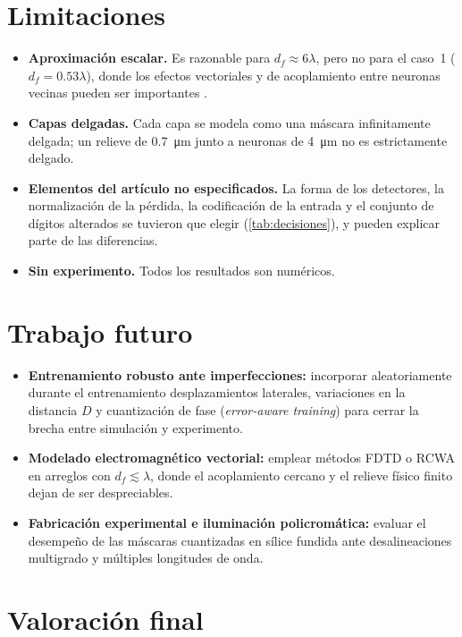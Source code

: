 \section{Limitaciones}

\begin{itemize}
  \item \textbf{Aproximación escalar.} Es razonable para $d_f\approx6\lambda$, pero no para el
  caso~1 ($d_f=0.53\lambda$), donde los efectos vectoriales y de acoplamiento entre neuronas
  vecinas pueden ser importantes \parencite[sec.~3.2]{goodman2005}.
  \item \textbf{Capas delgadas.} Cada capa se modela como una máscara infinitamente delgada; un
  relieve de \SI{0.7}{\micro m} junto a neuronas de \SI{4}{\micro m} no es estrictamente delgado.
  \item \textbf{Elementos del artículo no especificados.} La forma de los detectores, la
  normalización de la pérdida, la codificación de la entrada y el conjunto de dígitos
  alterados se tuvieron que elegir (\cref{tab:decisiones}), y pueden explicar parte de las
  diferencias.
  \item \textbf{Sin experimento.} Todos los resultados son numéricos.
\end{itemize}

\section{Trabajo futuro}

\begin{itemize}
  \item \textbf{Entrenamiento robusto ante imperfecciones:} incorporar aleatoriamente durante el
  entrenamiento desplazamientos laterales, variaciones en la distancia $D$ y cuantización de
  fase (\emph{error-aware training}) para cerrar la brecha entre simulación y experimento.
  \item \textbf{Modelado electromagnético vectorial:} emplear métodos FDTD o RCWA en arreglos
  con $d_f\lesssim\lambda$, donde el acoplamiento cercano y el relieve físico finito dejan de
  ser despreciables.
  \item \textbf{Fabricación experimental e iluminación policromática:} evaluar el desempeño
  de las máscaras cuantizadas en sílice fundida ante desalineaciones multigrado y múltiples
  longitudes de onda.
\end{itemize}

\section{Valoración final}

